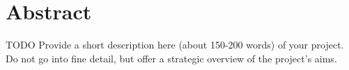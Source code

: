 \chapter*{Abstract}

TODO Provide a short description here (about 150-200 words) of your project. Do not go into fine detail, but offer a strategic overview of the project's aims.
